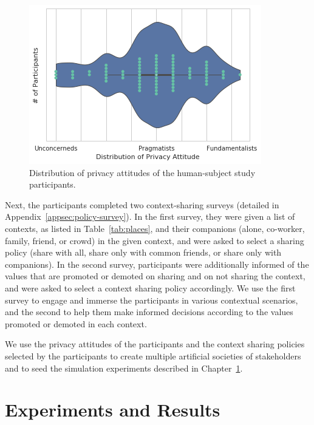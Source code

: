  
 \begin{figure}
     \centering
     \includegraphics[width=0.6\columnwidth]{./Chapter-5/fig/privacy-attitude-distribution.png}
     \caption[Distribution of privacy attitudes]{Distribution of privacy attitudes of the human-subject study participants. }
     \label{fig:participants-privacy-distribution}
 \end{figure}

Next, the participants completed two context-sharing surveys (detailed in Appendix~\ref{appsec:policy-survey}). 
In the first survey, they were given a list of contexts, as listed in Table~\ref{tab:places}, and their companions (alone, co-worker, family, friend, or crowd) in the given context, and were asked to select a sharing policy (share with all, share only with common friends, or share only with companions). In the second survey, participants were additionally informed of the values that are promoted or demoted on sharing and on not sharing the context, and were asked to select a context sharing policy accordingly. We use the first survey to engage and immerse the participants in various contextual scenarios, and the second to help them make informed decisions according to the values promoted or demoted in each context.

We use the privacy attitudes of the participants and the context sharing policies selected by the participants to create multiple artificial societies of stakeholders and to seed the simulation experiments described in Chapter~\ref{sec:results}. 

\section{Experiments and Results}
\label{sec:results}

